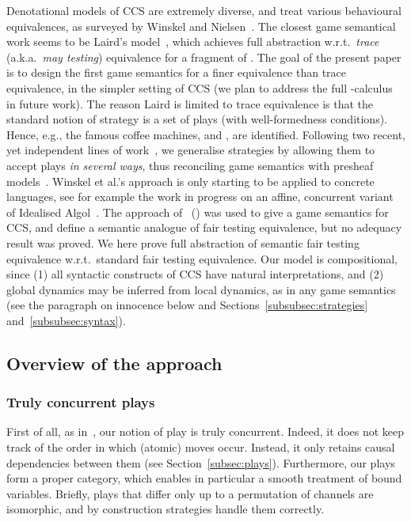 \documentclass{LMCS}
\theoremstyle{plain}\newtheorem{satz}[thm]{Satz}
\begin{document}
Denotational models of CCS are extremely diverse, and treat various
behavioural equivalences, as surveyed by Winskel and
Nielsen~\cite{WN}. The closest game semantical work seems to be
Laird's model~\cite{DBLP:conf/fsttcs/Laird06}, which achieves full
abstraction w.r.t.\ \emph{trace} (a.k.a.\ \emph{may testing})
equivalence for a fragment of .  The goal of the present paper is
to design the first game semantics for a finer equivalence than trace
equivalence, in the simpler setting of CCS (we plan to address the
full -calculus in future work).  The reason Laird is limited to
trace equivalence is that the standard notion of strategy is a set of
plays (with well-formedness conditions). Hence, e.g., the famous
coffee machines,  and , are identified.  Following
two recent, yet independent lines of work~\cite{RideauW,HP11}, we
generalise strategies by allowing them to accept plays \emph{in
  several ways}, thus reconciling game semantics with presheaf
models~\cite{DBLP:conf/lics/JoyalNW93}. Winskel et al.'s approach is
only starting to be applied to concrete languages, see for example the
work in progress on an affine, concurrent variant of Idealised
Algol~\cite{CCWGalop14}.  The approach
of~\cite{HP11,2011arXiv1109.4356H} ()
was used to give a game semantics for CCS, and define a semantic
analogue of fair testing equivalence, but no adequacy result was
proved. We here prove full abstraction of semantic fair testing
equivalence w.r.t.\ standard fair testing equivalence.  Our model is
compositional, since (1) all syntactic constructs of CCS have natural
interpretations, and (2) global dynamics may be inferred from local
dynamics, as in any game semantics (see the paragraph on innocence
below and Sections~\ref{subsubsec:strategies}
and~\ref{subsubsec:syntax}).

\subsection{Overview of the approach}
\subsubsection*{Truly concurrent plays}
First of all, as in~\cite{RideauW}, our notion of play is truly
concurrent.  Indeed, it does not keep track of the order in which
(atomic) moves occur.  Instead, it only retains causal dependencies
between them (see Section~\ref{subsec:plays}).  Furthermore, our plays
form a proper category, which enables in particular a smooth treatment
of bound variables. Briefly, plays that differ only up to a
permutation of channels are isomorphic, and by construction strategies
handle them correctly.
\end{document}
